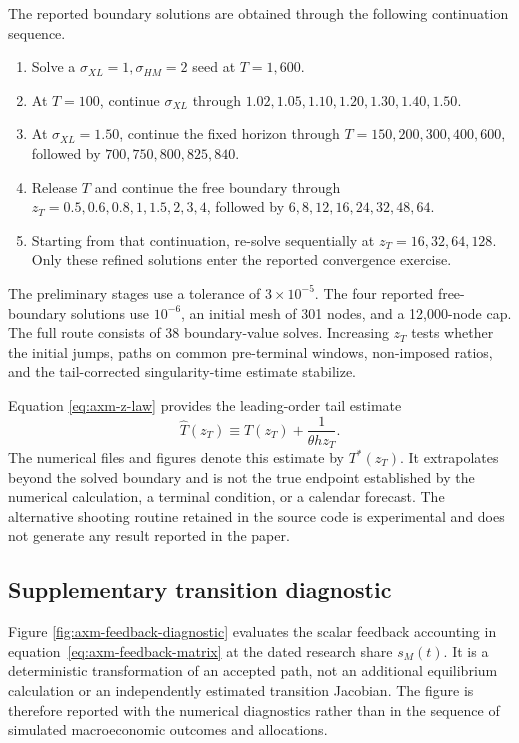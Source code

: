 The reported boundary solutions are obtained through the following continuation
sequence.
\begin{enumerate}[label=\textbf{Step \arabic*.},leftmargin=4.5em,labelsep=0.6em]
 \item Solve a \(\sigma_{XL}=1,\sigma_{HM}=2\) seed at \(T=1{,}600\).
 \item At \(T=100\), continue \(\sigma_{XL}\) through
 \(1.02,1.05,1.10,1.20,1.30,1.40,1.50\).
 \item At \(\sigma_{XL}=1.50\), continue the fixed horizon through
 \(T=150,200,300,400,600\), followed by \(700,750,800,825,840\).
 \item Release \(T\) and continue the free boundary through
 \(z_T=0.5,0.6,0.8,1,1.5,2,3,4\), followed by
 \(6,8,12,16,24,32,48,64\).
 \item Starting from that continuation, re-solve sequentially at
 \(z_T=16,32,64,128\). Only these refined solutions enter the reported
 convergence exercise.
\end{enumerate}
The preliminary stages use a tolerance of \(3\times10^{-5}\). The four reported
free-boundary solutions use \(10^{-6}\), an initial mesh of 301 nodes, and a
12,000-node cap. The full route consists of 38 boundary-value solves. Increasing
\(z_T\) tests whether the initial jumps, paths on common pre-terminal windows,
non-imposed ratios, and the tail-corrected singularity-time estimate stabilize.

Equation \eqref{eq:axm-z-law} provides the leading-order tail estimate
\begin{equation}
 \widehat T(z_T)\equiv T(z_T)+\frac{1}{\theta h z_T}.
 \label{eq:axm-singularity-tail-estimate}
\end{equation}
The numerical files and figures denote this estimate by \(T^*(z_T)\). It
extrapolates beyond the solved boundary and is not the true endpoint established
by the numerical calculation, a terminal condition, or a calendar forecast. The
alternative shooting routine retained in the source code is experimental and
does not generate any result reported in the paper.

\subsection{Supplementary transition diagnostic}

Figure \ref{fig:axm-feedback-diagnostic} evaluates the scalar feedback accounting
in equation~\eqref{eq:axm-feedback-matrix} at the dated research share
\(s_M(t)\). It is a deterministic transformation of an accepted path, not an
additional equilibrium calculation or an independently estimated transition
Jacobian. The figure is therefore reported with the numerical diagnostics rather
than in the sequence of simulated macroeconomic outcomes and allocations.

